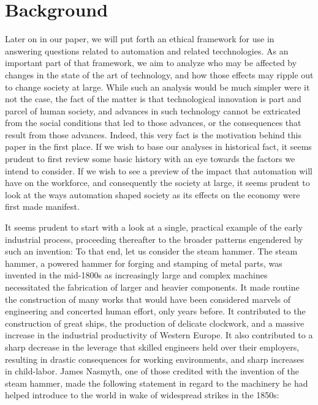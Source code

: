 \section{Background}
\label{sec:-background}

Later on in our paper, we will put forth an ethical framework for use 
in answering questions related to automation and related tecchnologies. 
As an important part of that framework, we aim to analyze who may be 
affected by changes in the state of the art of technology, and how 
those effects may ripple out to change society at large.  While such 
an analysis would be much simpler were it not the case, the fact of the 
matter is that technological innovation is part and parcel of human 
society, and advances in such technology cannot be extricated from 
the social conditions that led to those advances, or the consequences
that result from those advances.  Indeed, this very fact is the 
motivation behind this paper in the first place.  If we wish to base 
our analyses in historical fact, it seems prudent to first review some 
basic history with an eye towards the factors we intend to consider.  
If we wish to see a preview of the impact that automation will have 
on the workforce, and consequently the society at large, it seems 
prudent to look at the ways automation shaped society as its effects 
on the economy were first made manifest.

It seems prudent to start with a look at a single, practical example 
of the early industrial process, proceeding thereafter to the broader 
patterns engendered by such an invention: To that end, let us consider 
the steam hammer.  The steam hammer, a powered hammer for forging and 
stamping of metal parts, was invented in the mid-1800s as increasingly 
large and complex machines necessitated the fabrication of larger and 
heavier components.  It made routine the construction of many works 
that would have been considered marvels of engineering and concerted 
human effort, only years before.  It contributed to the construction 
of great ships, the production of delicate clockwork, and a massive 
increase in the industrial productivity of Western Europe.  It also 
contributed\cite{gaskell1833manufacturing} to a sharp decrease in the 
leverage that skilled engineers held over their employers, resulting in 
drastic consequences for working environments, and sharp increases in 
child-labor.  James Nasmyth, one of those credited with the invention 
of the steam hammer, made the following statement in regard to the 
machinery he had helped introduce to the world in wake of widespread 
strikes in the 1850s:

